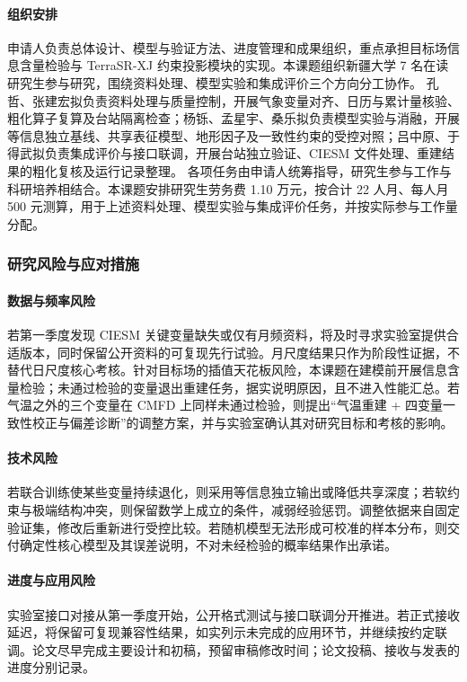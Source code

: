 \paragraph{组织安排}
申请人负责总体设计、模型与验证方法、进度管理和成果组织，重点承担目标场信息含量检验与 TerraSR-XJ 约束投影模块的实现。本课题组织新疆大学 7 名在读研究生参与研究，围绕资料处理、模型实验和集成评价三个方向分工协作。
\mbox{孔哲}、\mbox{张建宏}拟负责资料处理与质量控制，开展气象变量对齐、日历与累计量核验、粗化算子复算及台站隔离检查；\mbox{杨铄}、\mbox{孟星宇}、\mbox{桑乐}拟负责模型实验与消融，开展等信息独立基线、共享表征模型、地形因子及一致性约束的受控对照；\mbox{吕中原}、\mbox{于得武}拟负责集成评价与接口联调，开展台站独立验证、CIESM 文件处理、重建结果的粗化复核及运行记录整理。
各项任务由申请人统筹指导，研究生参与工作与科研培养相结合。本课题安排研究生劳务费 1.10 万元，按合计 22 人月、每人月 500 元测算，用于上述资料处理、模型实验与集成评价任务，并按实际参与工作量分配。

\subsubsection{研究风险与应对措施}

\paragraph{数据与频率风险}
若第一季度发现 CIESM 关键变量缺失或仅有月频资料，将及时寻求实验室提供合适版本，同时保留公开资料的可复现先行试验。月尺度结果只作为阶段性证据，不替代日尺度核心考核。针对目标场的插值天花板风险，本课题在建模前开展信息含量检验；未通过检验的变量退出重建任务，据实说明原因，且不进入性能汇总。若气温之外的三个变量在 CMFD 上同样未通过检验，则提出“气温重建 + 四变量一致性校正与偏差诊断”的调整方案，并与实验室确认其对研究目标和考核的影响。

\paragraph{技术风险}
若联合训练使某些变量持续退化，则采用等信息独立输出或降低共享深度；若软约束与极端结构冲突，则保留数学上成立的条件，减弱经验惩罚。调整依据来自固定验证集，修改后重新进行受控比较。若随机模型无法形成可校准的样本分布，则交付确定性核心模型及其误差说明，不对未经检验的概率结果作出承诺。

\paragraph{进度与应用风险}
实验室接口对接从第一季度开始，公开格式测试与接口联调分开推进。若正式接收延迟，将保留可复现兼容性结果，如实列示未完成的应用环节，并继续按约定联调。论文尽早完成主要设计和初稿，预留审稿修改时间；论文投稿、接收与发表的进度分别记录。

